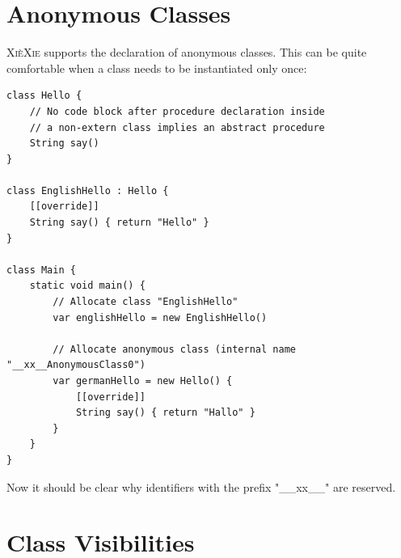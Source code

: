 \documentclass[a5paper]{report}
\def\xiexie{\textsc{Xi\`eXie}\xspace}
\begin{document}
\section{Anonymous Classes}

\xiexie supports the declaration of anonymous classes. This can be quite comfortable when a class needs to be
instantiated only once:
\begin{lstlisting}
class Hello {
    // No code block after procedure declaration inside 
    // a non-extern class implies an abstract procedure
    String say()
}

class EnglishHello : Hello {
    [[override]]
    String say() { return "Hello" }
}

class Main {
    static void main() {
        // Allocate class "EnglishHello"
        var englishHello = new EnglishHello()
        
        // Allocate anonymous class (internal name "__xx__AnonymousClass0")
        var germanHello = new Hello() {
            [[override]]
            String say() { return "Hallo" }
        }
    }
}
\end{lstlisting}
Now it should be clear why identifiers with the prefix "\_\_xx\_\_" are reserved.



\section{Class Visibilities}
\end{document}
